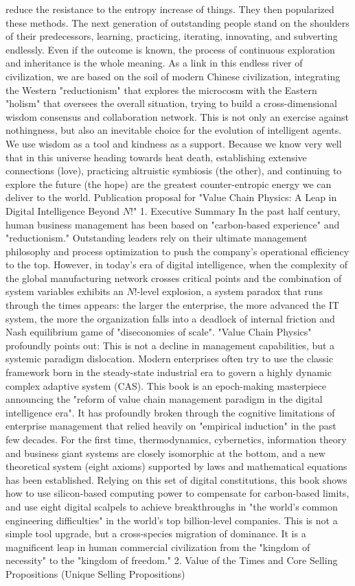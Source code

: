 \documentclass[11pt,a4paper]{article}
\begin{document}
reduce the resistance to the entropy increase of things. They then popularized these methods. The next generation of outstanding people stand on the shoulders of their predecessors, learning, practicing, iterating, innovating, and subverting endlessly. Even if the outcome is known, the process of continuous exploration and inheritance is the whole meaning. As a link in this endless river of civilization, we are based on the soil of modern Chinese civilization, integrating the Western "reductionism" that explores the microcosm with the Eastern "holism" that oversees the overall situation, trying to build a cross-dimensional wisdom consensus and collaboration network. This is not only an exercise against nothingness, but also an inevitable choice for the evolution of intelligent agents. We use wisdom as a tool and kindness as a support. Because we know very well that in this universe heading towards heat death, establishing extensive connections (love), practicing altruistic symbiosis (the other), and continuing to explore the future (the hope) are the greatest counter-entropic energy we can deliver to the world. Publication proposal for "Value Chain Physics: A Leap in Digital Intelligence Beyond $N!$" 1. Executive Summary In the past half century, human business management has been based on "carbon-based experience" and "reductionism." Outstanding leaders rely on their ultimate management philosophy and process optimization to push the company's operational efficiency to the top. However, in today's era of digital intelligence, when the complexity of the global manufacturing network crosses critical points and the combination of system variables exhibits an $N!$-level explosion, a system paradox that runs through the times appears: the larger the enterprise, the more advanced the IT system, the more the organization falls into a deadlock of internal friction and Nash equilibrium game of "diseconomies of scale". "Value Chain Physics" profoundly points out: This is not a decline in management capabilities, but a systemic paradigm dislocation. Modern enterprises often try to use the classic framework born in the steady-state industrial era to govern a highly dynamic complex adaptive system (CAS). This book is an epoch-making masterpiece announcing the "reform of value chain management paradigm in the digital intelligence era". It has profoundly broken through the cognitive limitations of enterprise management that relied heavily on "empirical induction" in the past few decades. For the first time, thermodynamics, cybernetics, information theory and business giant systems are closely isomorphic at the bottom, and a new theoretical system (eight axioms) supported by laws and mathematical equations has been established. Relying on this set of digital constitutions, this book shows how to use silicon-based computing power to compensate for carbon-based limits, and use eight digital scalpels to achieve breakthroughs in "the world's common engineering difficulties" in the world's top billion-level companies. This is not a simple tool upgrade, but a cross-species migration of dominance. It is a magnificent leap in human commercial civilization from the "kingdom of necessity" to the "kingdom of freedom." 2. Value of the Times and Core Selling Propositions (Unique Selling Propositions) 
\end{document}
